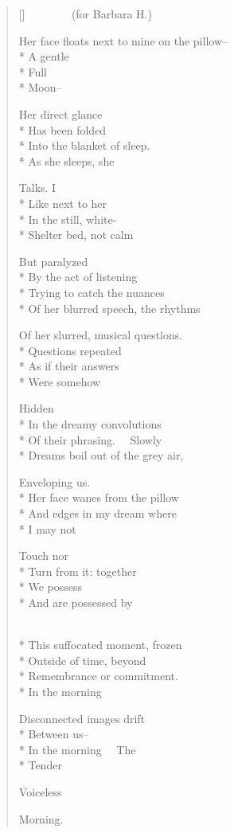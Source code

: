 \label{ch:poem_from_a_restless_sleep}
\settowidth{\versewidth}{Her face floats next to mine on the pillow--}
\begin{verse}[\versewidth]
         (for Barbara H.)

Her face floats next to mine on the pillow--\\*
A gentle\\*
Full\\*
Moon--

Her direct glance\\*
Has been folded\\*
Into the blanket of sleep.\\*
As she sleeps, she

Talks. I\\*
Like next to her\\*
In the still, white-\\*
Shelter bed, not calm

But paralyzed\\*
By the act of listening\\*
Trying to catch the nuances\\*
Of her blurred speech, the rhythms

Of her slurred, musical questions.\\*
Questions repeated\\*
As if their answers\\*
Were somehow

Hidden\\*
In the dreamy convolutions\\*
Of their phrasing.   Slowly\\*
Dreams boil out of the grey air,

Enveloping us.\\*
Her face wanes from the pillow\\*
And edges in my dream where\\*
I may not

Touch nor\\*
Turn from it: together\\*
We possess\\*
And are possessed by

\\*
This suffocated moment, frozen\\*
Outside of time, beyond\\*
Remembrance or commitment.\\*
In the morning

Disconnected images drift\\*
Between us--\\*
In the morning   The\\*
Tender

Voiceless

Morning.
\end{verse}
